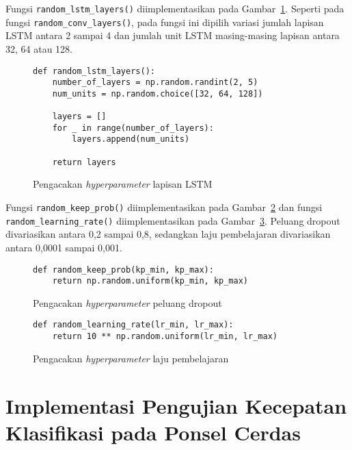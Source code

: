 Fungsi \texttt{random_lstm_layers()} diimplementasikan pada Gambar~\ref{listing:har-random-lstm-layers}. Seperti pada fungsi \texttt{random_conv_layers()}, pada fungsi ini dipilih variasi jumlah lapisan LSTM antara 2 sampai 4 dan jumlah unit LSTM masing-masing lapisan antara 32, 64 atau 128.

\begin{figure}[h]
\begin{verbatim}
def random_lstm_layers():
    number_of_layers = np.random.randint(2, 5)
    num_units = np.random.choice([32, 64, 128])

    layers = []
    for _ in range(number_of_layers):
        layers.append(num_units)

    return layers
\end{verbatim}
\caption{Pengacakan \textit{hyperparameter} lapisan LSTM}
\label{listing:har-random-lstm-layers}
\end{figure}

Fungsi \texttt{random_keep_prob()} diimplementasikan pada Gambar~\ref{listing:har-random-keep-prob} dan fungsi \texttt{random_learning_rate()} diimplementasikan pada Gambar~\ref{listing:har-random-learning-rate}. Peluang dropout divariasikan antara 0,2 sampai 0,8, sedangkan laju pembelajaran divariasikan antara 0,0001 sampai 0,001.

\begin{figure}[h]
\begin{verbatim}
def random_keep_prob(kp_min, kp_max):
    return np.random.uniform(kp_min, kp_max)
\end{verbatim}
\caption{Pengacakan \textit{hyperparameter} peluang dropout}
\label{listing:har-random-keep-prob}
\end{figure}

\begin{figure}[h]
\begin{verbatim}
def random_learning_rate(lr_min, lr_max):
    return 10 ** np.random.uniform(lr_min, lr_max)
\end{verbatim}
\caption{Pengacakan \textit{hyperparameter} laju pembelajaran}
\label{listing:har-random-learning-rate}
\end{figure}

\section{Implementasi Pengujian Kecepatan Klasifikasi pada Ponsel Cerdas}

